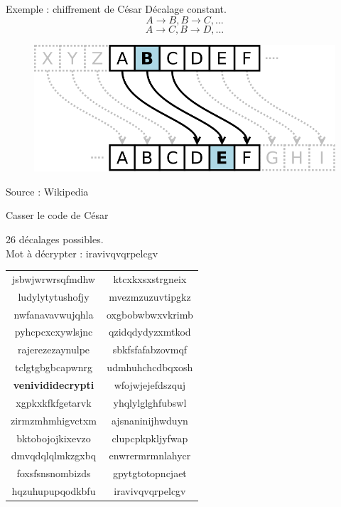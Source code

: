 \documentclass{beamer}
\begin{document}
\begin{frame}{Exemple : chiffrement de César}
  Décalage constant. 
$$A\rightarrow B, B\rightarrow C, \text{...}$$ 
$$A\rightarrow C, B\rightarrow D, \text{...}$$

  \begin{figure}
    \centering
  \includegraphics[scale = 0.25]{cesar.png}
\end{figure}
\footnotesize{Source : Wikipedia}
\end{frame}


\begin{frame}{Casser le code de César}
\begin{block}{}
  26 décalages possibles.\\
  Mot à décrypter :  iravivqvqrpelcgv 
\end{block}
  

\footnotesize
\begin{tabular}{c c}
jsbwjwrwrsqfmdhw &  
ktcxkxsxstrgneix\\
ludylytytushofjy &  
mvezmzuzuvtipgkz\\
nwfanavavwujqhla &   
oxgbobwbwxvkrimb\\
pyhcpcxcxywlsjnc & 
qzidqdydyzxmtkod\\
rajerezezaynulpe &
sbkfsfafabzovmqf\\
tclgtgbgbcapwnrg &
udmhuhchcdbqxosh\\
\textbf{\textcolor{red!60!black}{venivididecrypti}} &
wfojwjejefdszquj\\
xgpkxkfkfgetarvk &
yhqlylglghfubswl\\
zirmzmhmhigvctxm &
ajsnaninijhwduyn\\
bktobojojkixevzo &
clupcpkpkljyfwap\\
dmvqdqlqlmkzgxbq &
enwrermrmnlahycr\\
foxsfsnsnombizds &
gpytgtotopncjaet\\
hqzuhupupqodkbfu &
iravivqvqrpelcgv\\
\end{tabular}
\normalsize
  \end{frame}
\end{document}
